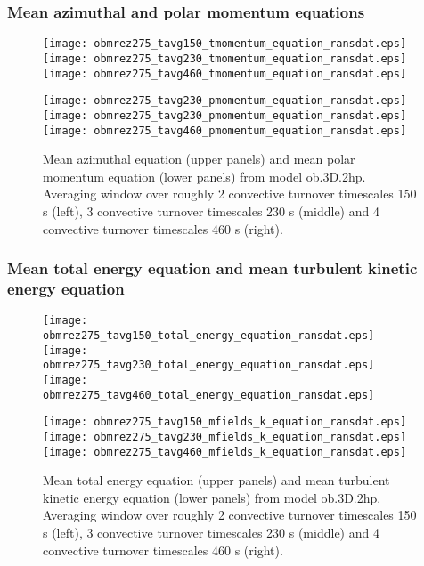 \documentclass[10pt,paper=a4]{report}
\begin{document}
\newpage

\subsubsection{Mean azimuthal and polar momentum equations}

\begin{figure}[!h]
\centerline{
\texttt{[image: obmrez275\_tavg150\_tmomentum\_equation\_ransdat.eps]}
\texttt{[image: obmrez275\_tavg230\_tmomentum\_equation\_ransdat.eps]}
\texttt{[image: obmrez275\_tavg460\_tmomentum\_equation\_ransdat.eps]}}

\centerline{
\texttt{[image: obmrez275\_tavg230\_pmomentum\_equation\_ransdat.eps]}
\texttt{[image: obmrez275\_tavg230\_pmomentum\_equation\_ransdat.eps]}
\texttt{[image: obmrez275\_tavg460\_pmomentum\_equation\_ransdat.eps]}}
\caption{Mean azimuthal equation (upper panels) and mean polar momentum equation (lower panels) from model {\sf ob.3D.2hp}. Averaging window over roughly 2 convective turnover timescales 150 s (left), 3 convective turnover timescales 230 s (middle) and 4 convective turnover timescales 460 s (right). }
\end{figure}

\newpage

\subsubsection{Mean total energy equation and mean turbulent kinetic energy equation}

\begin{figure}[!h]
\centerline{
\texttt{[image: obmrez275\_tavg150\_total\_energy\_equation\_ransdat.eps]}
\texttt{[image: obmrez275\_tavg230\_total\_energy\_equation\_ransdat.eps]}
\texttt{[image: obmrez275\_tavg460\_total\_energy\_equation\_ransdat.eps]}}

\centerline{
\texttt{[image: obmrez275\_tavg150\_mfields\_k\_equation\_ransdat.eps]}
\texttt{[image: obmrez275\_tavg230\_mfields\_k\_equation\_ransdat.eps]}
\texttt{[image: obmrez275\_tavg460\_mfields\_k\_equation\_ransdat.eps]}}
\caption{Mean total energy equation (upper panels) and mean turbulent kinetic energy equation (lower panels) from model {ob.3D.2hp}. Averaging window over roughly 2 convective turnover timescales 150 s (left), 3 convective turnover timescales 230 s (middle) and 4 convective turnover timescales 460 s (right).}
\end{figure}
\end{document}
